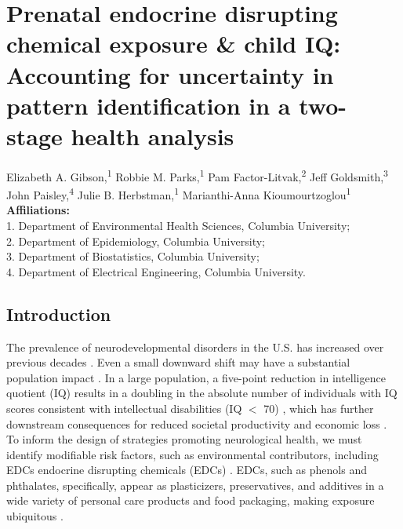 \chapter[Prenatal endocrine disrupting chemical exposure \& child IQ]{Prenatal endocrine disrupting chemical exposure \& child IQ: {\LARGE Accounting for uncertainty in pattern identification in a two-stage health analysis}}\label{sec:ch4}
\vspace{-3em}

\begin{center}
Elizabeth A. Gibson,\textsuperscript{1} 
Robbie M. Parks,\textsuperscript{1}
Pam Factor-Litvak,\textsuperscript{2} 
Jeff Goldsmith,\textsuperscript{3} 
John Paisley,\textsuperscript{4} 
Julie B. Herbstman,\textsuperscript{1} 
Marianthi-Anna Kioumourtzoglou\textsuperscript{1} \\ 

\textbf{Affiliations:} \\ 1. Department of Environmental Health Sciences, Columbia University; \\ 
2. Department of Epidemiology, Columbia University; \\ 
3. Department of Biostatistics, Columbia University; \\ 
4. Department of Electrical Engineering, Columbia University. 
\end{center}

\clearpage

\section{Introduction}
The prevalence of neurodevelopmental disorders in the U.S. has increased over previous decades \cite{boyle2011trends}. Even a small downward shift may have a substantial population impact \cite{gore2015edc}. In a large population, a five-point reduction in intelligence quotient (IQ) results in a doubling in the absolute number of individuals with IQ scores consistent with intellectual disabilities (IQ $<$ 70) \cite{braun2017early}, which has further downstream consequences for reduced societal productivity and economic loss \cite{bellanger2015neurobehavioral}. To inform the design of strategies promoting neurological health, we must identify modifiable risk factors, such as environmental contributors, including EDCs endocrine disrupting chemicals (EDCs) \cite{sathyanarayana2008phthalates, gore2015edc}. EDCs, such as phenols and phthalates, specifically, appear as plasticizers, preservatives, and additives in a wide variety of personal care products and food packaging, making exposure ubiquitous \cite{philippat2015exposure, schettler2006human, lorber2015exposure, koniecki2011phthalates}. 


